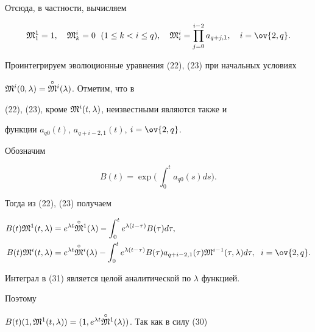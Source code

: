 Отсюда, в частности, вычисляем 


\begin{equation} 


\frak M^1_1=1,\quad \frak M^i_k=0 \ \;(1\le k<i\le q),\quad 


\frak M^i_i=\prod^{i-2}_{j=0}a_{q+j,1},\quad i=\ov{2,q}. 


\end{equation} 


 


Проинтегрируем эволюционные уравнения (22), (23) при начальных условиях 


$\frak M^i(0,\lambda)=\overset{\circ}{\frak M}{}^i(\lambda)$. Отметим, что в 


(22), (23), кроме $\frak M^i(t,\lambda)$, неизвестными являются также и 


функции $a_{q0}(t)$, $a_{q+i-2,1}(t)$, $i=\ov{2,q}$. 


 


Обозначим 


$$ 


B(t)=\exp\bigg(\,\int^t_0 a_{q0}(s)ds\bigg). 


$$ 


Тогда из (22), (23) получаем 


\begin{align} 


B(t)\frak M^1(t,\lambda)&=e^{\lambda t}\up{\circ}{\frak M}^1 


(\lambda)-\int^t_0 e^{\lambda(t-\tau)}B(\tau)d\tau, \\ 


B(t)\frak M^i(t,\lambda)&=e^{\lambda t}\up{\circ}{\frak M}^i 


(\lambda)-\int^t_0 e^{\lambda(t-\tau)}B(\tau) 


a_{q+i-2,1}(\tau) 


\frak M^{i-1}(\tau,\lambda)d\tau,\ \;i=\ov{2,q}. 


\end{align} 


 


Интеграл в (31) является целой аналитической по $\lambda$ функцией. 


Поэтому 


$B(t)(1,\frak M^1(t,\lambda))= 


(1,e^{\lambda t}\up{\circ}{\frak M}^1(\lambda))$. Так как в силу (30)\; 


